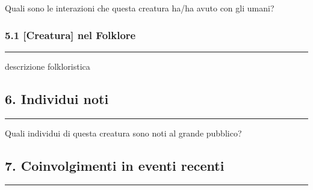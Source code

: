 Quali sono le interazioni che questa creatura ha/ha avuto con gli umani?

\subsubsection{5.1 {[}Creatura{]} nel
Folklore}\label{creatura-nel-folklore}

\begin{center}\rule{0.5\linewidth}{0.5pt}\end{center}

descrizione folkloristica

\subsection{6. Individui noti}\label{individui-noti}

\begin{center}\rule{0.5\linewidth}{0.5pt}\end{center}

Quali individui di questa creatura sono noti al grande pubblico?

\subsection{7. Coinvolgimenti in eventi
recenti}\label{coinvolgimenti-in-eventi-recenti}

\begin{center}\rule{0.5\linewidth}{0.5pt}\end{center}

\href{Untitled\%20d9b3de5a750946a69159e1b2d9154341.csv}{}
